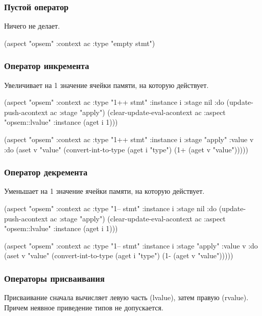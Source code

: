 \documentclass[12pt,twoside,russian]{article}
\begin{document}
\subsubsection{Пустой оператор}
Ничего не делает.

\begin{ABMLCode}
(aspect "opsem" :context ac :type "empty stmt")
\end{ABMLCode}


\subsubsection{Оператор инкремента}
Увеличивает на 1 значение ячейки памяти, на которую действует.

\begin{ABMLCode}
(aspect "opsem" :context ac :type "1++ stmt" :instance i :stage nil 
:do 
  (update-push-acontext ac :stage "apply")
  (clear-update-eval-acontext ac :aspect "opsem::lvalue" 
                                 :instance (aget i 1)))

(aspect "opsem" :context ac :type "1++ stmt" :instance i :stage "apply" 
  :value v :do 
  (aset v "value" (convert-int-to-type (aget i "type") 
                                       (1+ (aget v "value")))))
\end{ABMLCode}


\subsubsection{Оператор декремента}
Уменьшает на 1 значение ячейки памяти, на которую действует.

\begin{ABMLCode}
(aspect "opsem" :context ac :type "1-- stmt" :instance i :stage nil 
:do 
  (update-push-acontext ac :stage "apply")
  (clear-update-eval-acontext ac :aspect "opsem::lvalue" 
                                 :instance (aget i 1)))

(aspect "opsem" :context ac :type "1-- stmt" :instance i :stage "apply" 
  :value v :do 
  (aset v "value" (convert-int-to-type (aget i "type") 
                                       (1- (aget v "value")))))
\end{ABMLCode}


\subsubsection{Операторы присваивания}
Присваивание сначала вычисляет левую часть (lvalue), затем правую (rvalue). Причем неявное приведение типов не допускается.
\end{document}
